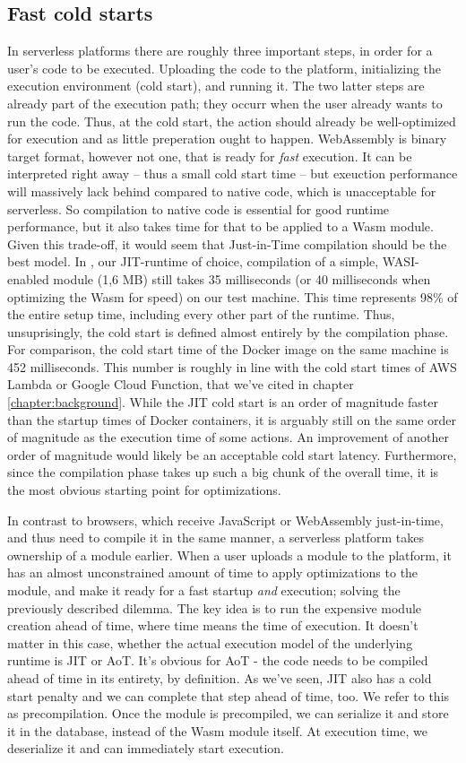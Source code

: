 \subsection{Fast cold starts}
In serverless platforms there are roughly three important steps, in order for a user's code to be executed. Uploading the code to the platform, initializing the execution environment (cold start), and running it. The two latter steps are already part of the execution path; they occurr when the user already wants to run the code. Thus, at the cold start, the action should already be well-optimized for execution and as little preperation ought to happen. WebAssembly is binary target format, however not one, that is ready for \emph{fast} execution. It can be interpreted right away -- thus a small cold start time -- but exeuction performance will massively lack behind compared to native code, which is unacceptable for serverless. So compilation to native code is essential for good runtime performance, but it also takes time for that to be applied to a Wasm module. Given this trade-off, it would seem that Just-in-Time compilation should be the best model. In , our JIT-runtime of choice, compilation of a simple, WASI-enabled module (1,6 MB) still takes 35 milliseconds (or 40 milliseconds when optimizing the Wasm for speed) on our test machine. This time represents 98\% of the entire setup time, including every other part of the runtime. Thus, unsuprisingly, the cold start is defined almost entirely by the compilation phase. For comparison, the cold start time of the  Docker image on the same machine is 452 milliseconds. This number is roughly in line with the cold start times of AWS Lambda or Google Cloud Function, that we've cited in chapter \ref{chapter:background}. While the JIT cold start is an order of magnitude faster than the startup times of Docker containers, it is arguably still on the same order of magnitude as the execution time of some actions. An improvement of another order of magnitude would likely be an acceptable cold start latency.
Furthermore, since the compilation phase takes up such a big chunk of the overall time, it is the most obvious starting point for optimizations.

In contrast to browsers, which receive JavaScript or WebAssembly just-in-time, and thus need to compile it in the same manner, a serverless platform takes ownership of a module earlier. When a user uploads a module to the platform, it has an almost unconstrained amount of time to apply optimizations to the module, and make it ready for a fast startup \emph{and} execution; solving the previously described dilemma. The key idea is to run the expensive module creation ahead of time, where time means the time of execution. It doesn't matter in this case, whether the actual execution model of the underlying runtime is JIT or AoT. It's obvious for AoT - the code needs to be compiled ahead of time in its entirety, by definition. As we've seen, JIT also has a cold start penalty and we can complete that step ahead of time, too. We refer to this as precompilation. Once the module is precompiled, we can serialize it and store it in the database, instead of the Wasm module itself. At execution time, we deserialize it and can immediately start execution.

